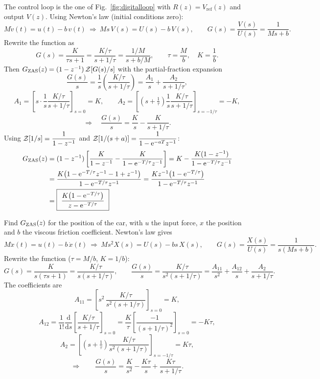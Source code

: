 \begin{example}
\noindent The control loop is the one of Fig.~\ref{fig:digitalloop} with $R(z)=V_{\mathrm{ref}}(z)$ and output $V(z)$.
Using Newton's law (initial conditions zero):
\[
  M\dot v(t)=u(t)-b\,v(t)\ \Rightarrow\ Ms\,V(s)=U(s)-b\,V(s),\qquad
  G(s)=\frac{V(s)}{U(s)}=\frac{1}{Ms+b}.
\]
Rewrite the function as
\[
  G(s)=\frac{K}{\tau s+1}=\frac{K/\tau}{s+1/\tau}=\frac{1/M}{s+b/M},\qquad \tau=\frac Mb,\quad K=\frac1b.
\]
Then $G_{\mathrm{ZAS}}(z)=(1-z^{-1})\,\mathcal{Z}\!\left[G(s)/s\right]$ with the partial-fraction expansion
\[
  \frac{G(s)}{s}=\frac1s\left(\frac{K/\tau}{s+1/\tau}\right)=\frac{A_1}{s}+\frac{A_2}{s+1/\tau},
\]
\[
  A_1=\left[s\cdot\frac1s\frac{K/\tau}{s+1/\tau}\right]_{s=0}=K,\qquad
  A_2=\left[\left(s+\tfrac1\tau\right)\frac1s\frac{K/\tau}{s+1/\tau}\right]_{s=-1/\tau}=-K,
\]
\[
  \Rightarrow\quad \frac{G(s)}{s}=\frac Ks-\frac{K}{s+1/\tau}.
\]
Using $\mathcal{Z}\!\left[1/s\right]=\dfrac{1}{1-z^{-1}}$ and $\mathcal{Z}\!\left[1/(s+a)\right]=\dfrac{1}{1-\mathrm{e}^{-aT}z^{-1}}$:
\begin{align*}
  G_{\mathrm{ZAS}}(z)&=(1-z^{-1})\left[\frac{K}{1-z^{-1}}-\frac{K}{1-\mathrm{e}^{-T/\tau}z^{-1}}\right]
  =K-\frac{K(1-z^{-1})}{1-\mathrm{e}^{-T/\tau}z^{-1}}\\
  &=\frac{K\bigl(1-\mathrm{e}^{-T/\tau}z^{-1}-1+z^{-1}\bigr)}{1-\mathrm{e}^{-T/\tau}z^{-1}}
  =\frac{K z^{-1}\bigl(1-\mathrm{e}^{-T/\tau}\bigr)}{1-\mathrm{e}^{-T/\tau}z^{-1}}\\
  &=\boxed{\ \frac{K\bigl(1-\mathrm{e}^{-T/\tau}\bigr)}{z-\mathrm{e}^{-T/\tau}}\ }
\end{align*}
\end{example}

\begin{example}
Find $G_{\mathrm{ZAS}}(z)$ for the position of the car, with $u$ the input force, $x$ the position and $b$ the viscous
friction coefficient. Newton's law gives
\[
  M\ddot x(t)=u(t)-b\,\dot x(t)\ \Rightarrow\ Ms^{2}X(s)=U(s)-bs\,X(s),\qquad
  G(s)=\frac{X(s)}{U(s)}=\frac{1}{s(Ms+b)}.
\]
Rewrite the function ($\tau=M/b$, $K=1/b$):
\[
  G(s)=\frac{K}{s(\tau s+1)}=\frac{K/\tau}{s(s+1/\tau)},\qquad
  \frac{G(s)}{s}=\frac{K/\tau}{s^{2}(s+1/\tau)}=\frac{A_{11}}{s^{2}}+\frac{A_{12}}{s}+\frac{A_2}{s+1/\tau}.
\]
The coefficients are
\[
  A_{11}=\left[s^{2}\,\frac{K/\tau}{s^{2}(s+1/\tau)}\right]_{s=0}=K,
\]
\[
  A_{12}=\frac{1}{1!}\frac{\mathrm d}{\mathrm ds}\left[\frac{K/\tau}{s+1/\tau}\right]_{s=0}
  =\frac K\tau\left[\frac{-1}{(s+1/\tau)^{2}}\right]_{s=0}=-K\tau,
\]
\[
  A_2=\left[\left(s+\tfrac1\tau\right)\frac{K/\tau}{s^{2}(s+1/\tau)}\right]_{s=-1/\tau}=K\tau,
\]
\[
  \Rightarrow\qquad \frac{G(s)}{s}=\frac{K}{s^{2}}-\frac{K\tau}{s}+\frac{K\tau}{s+1/\tau}.
\]
\end{example}

